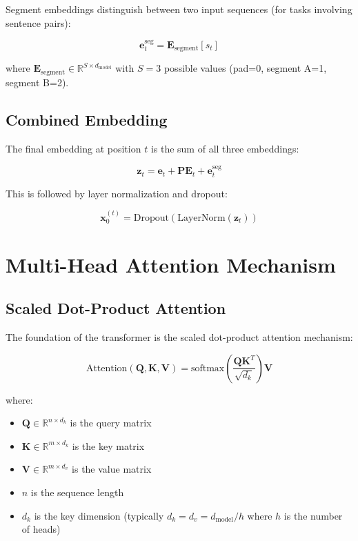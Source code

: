 \documentclass[11pt,a4paper]{article}
\begin{document}
Segment embeddings distinguish between two input sequences (for tasks involving sentence pairs):

\begin{equation}
\mathbf{e}^{\text{seg}}_t = \mathbf{E}_{\text{segment}}[s_t]
\end{equation}

where $\mathbf{E}_{\text{segment}} \in \mathbb{R}^{S \times d_{\text{model}}}$ with $S=3$ possible values (pad=0, segment A=1, segment B=2).

\subsection{Combined Embedding}

The final embedding at position $t$ is the sum of all three embeddings:

\begin{equation}
\mathbf{z}_t = \mathbf{e}_t + \mathbf{PE}_t + \mathbf{e}^{\text{seg}}_t
\end{equation}

This is followed by layer normalization and dropout:

\begin{equation}
\mathbf{x}_0^{(t)} = \text{Dropout}(\text{LayerNorm}(\mathbf{z}_t))
\end{equation}

\section{Multi-Head Attention Mechanism}

\subsection{Scaled Dot-Product Attention}

The foundation of the transformer is the scaled dot-product attention mechanism:

\begin{equation}
\text{Attention}(\mathbf{Q}, \mathbf{K}, \mathbf{V}) = \text{softmax}\left(\frac{\mathbf{Q}\mathbf{K}^T}{\sqrt{d_k}}\right)\mathbf{V}
\end{equation}

where:
\begin{itemize}
    \item $\mathbf{Q} \in \mathbb{R}^{n \times d_k}$ is the query matrix
    \item $\mathbf{K} \in \mathbb{R}^{m \times d_k}$ is the key matrix
    \item $\mathbf{V} \in \mathbb{R}^{m \times d_v}$ is the value matrix
    \item $n$ is the sequence length
    \item $d_k$ is the key dimension (typically $d_k = d_v = d_{\text{model}}/h$ where $h$ is the number of heads)
\end{itemize}
\end{document}
